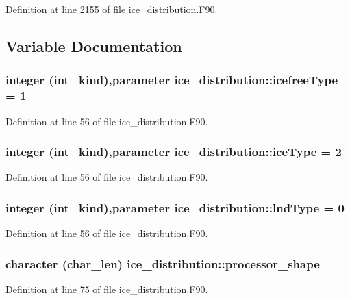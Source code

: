 Definition at line 2155 of file ice\_\-distribution.F90.

\subsection{Variable Documentation}
\hypertarget{namespaceice__distribution_a9a24a6c9c4809cf7bcc2f823d5658e91}{
\subsubsection[{icefreeType}]{\setlength{\rightskip}{0pt plus 5cm}integer (int\_\-kind),parameter {\bf ice\_\-distribution::icefreeType} = 1}}
\label{namespaceice__distribution_a9a24a6c9c4809cf7bcc2f823d5658e91}


Definition at line 56 of file ice\_\-distribution.F90.\hypertarget{namespaceice__distribution_ad7d8ab8d3b272938146dae0343de0ffb}{
\subsubsection[{iceType}]{\setlength{\rightskip}{0pt plus 5cm}integer (int\_\-kind),parameter {\bf ice\_\-distribution::iceType} = 2}}
\label{namespaceice__distribution_ad7d8ab8d3b272938146dae0343de0ffb}


Definition at line 56 of file ice\_\-distribution.F90.\hypertarget{namespaceice__distribution_a70c7db6c7a84f62b66e1a5880040b9aa}{
\subsubsection[{lndType}]{\setlength{\rightskip}{0pt plus 5cm}integer (int\_\-kind),parameter {\bf ice\_\-distribution::lndType} = 0}}
\label{namespaceice__distribution_a70c7db6c7a84f62b66e1a5880040b9aa}


Definition at line 56 of file ice\_\-distribution.F90.\hypertarget{namespaceice__distribution_a3f7e1befe15a2793e62360b81c5fa130}{
\subsubsection[{processor\_\-shape}]{\setlength{\rightskip}{0pt plus 5cm}character (char\_\-len) {\bf ice\_\-distribution::processor\_\-shape}}}
\label{namespaceice__distribution_a3f7e1befe15a2793e62360b81c5fa130}


Definition at line 75 of file ice\_\-distribution.F90.